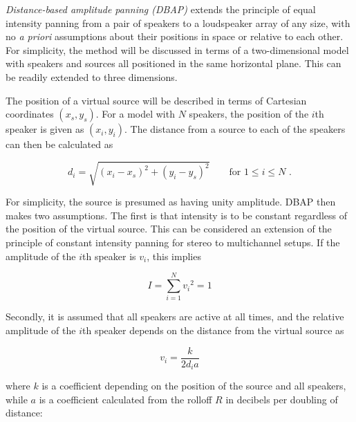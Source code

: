 \documentclass[twoside,10pt]{article}
\begin{document}

\textit{Distance-based amplitude panning (DBAP)} extends the principle of equal intensity panning from a pair of speakers to a loudspeaker array of any size, with no \textit{a priori} assumptions about their positions in space or relative to each other.
For simplicity, the method will be discussed in terms of a two-dimensional model with speakers and sources all positioned in the same horizontal plane. This can be readily extended to three dimensions.

The position of a virtual source will be described in terms of Cartesian coordinates $(x_{s}, y_{s})$. For a model with $N$ speakers, the position of the $i$th speaker is given as $(x_{i}, y_{i})$. The distance from a source to each of the speakers can then be calculated as

\begin{equation} \label{eq:distance}
d_{i} = \sqrt{ {(x_{i} - x_{s})}^2 + {(y_{i} - y_{s})}^2 } \qquad \textrm{for } 1 \leq i \leq N \textrm{ .}
\end{equation}

For simplicity, the source is presumed as having unity amplitude. DBAP then makes two assumptions. The first is that intensity is to be constant regardless of the position of the virtual source. This can be considered an extension of the principle of constant intensity panning for stereo to multichannel setups. If the amplitude of the $i$th speaker is $v_{i}$, this implies

\begin{equation} \label{eq:constant_intensity}
I = \sum_{i=1}^{N} {v_{i}}^2 = 1
\end{equation}

Secondly, it is assumed that all speakers are active at all times, and the relative amplitude of the $i$th speaker depends on the distance from the virtual source as 

\begin{equation} \label{eq:inverse_distance}
v_{i} = \frac{k}{2 d_{i} a} 
\end{equation}

where $k$ is a coefficient depending on the position of the source and all speakers, while $a$ is a coefficient calculated from the rolloff $R$ in decibels per doubling of distance:
\end{document}
